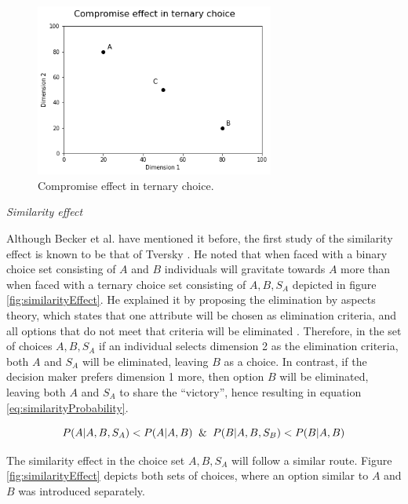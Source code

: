 \documentclass[a4paper,12pt]{article}
\newcommand{\citeyearonly}[1]{\citeyearpar{#1}}
\begin{document}
\begin{figure}[h]
    \centering
    \includegraphics[width=0.7\textwidth]{staticFiles/compromiseEffect.png}
    \caption{Compromise effect in ternary choice.} %
    \label{fig:compromiseEffect} %

\end{figure}

\textit{Similarity effect}

Although Becker et al. \citeyearonly{becker1964measuring} have mentioned it before, the first study of the similarity effect is known to be that of Tversky \citep{tversky1972elimination}. He noted that when faced with a binary choice set consisting of $A$ and $B$ individuals will gravitate towards $A$ more than when faced with a ternary choice set consisting of ${A, B, S_A}$ depicted in figure \ref{fig:similarityEffect}. He explained it by proposing the elimination by aspects theory, which states that one attribute will be chosen as elimination criteria, and all options that do not meet that criteria will be eliminated \citep{tversky1972elimination}. Therefore, in the set of choices ${A, B, S_A}$ if an individual selects dimension 2 as the elimination criteria, both $A$ and $S_A$ will be eliminated, leaving $B$ as a choice. In contrast, if the decision maker prefers dimension 1 more, then option
$B$ will be eliminated, leaving both $A$ and $S_A$ to share the ``victory'', hence resulting in equation \ref{eq:similarityProbability}.

\begin{equation}\label{eq:similarityProbability}
    P(A|A,B,S_A) < P(A|A,B) \And  P(B|A,B,S_B) < P(B|A,B)
\end{equation}

The similarity effect in the choice set ${A, B, S_A}$ will follow a similar route. Figure \ref{fig:similarityEffect} depicts both sets of choices, where an option similar to $A$ and $B$ was introduced separately.
\end{document}
